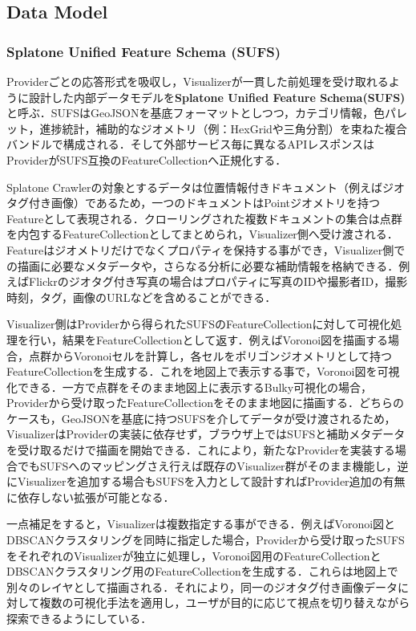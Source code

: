 \subsection{Data Model}

\subsubsection{Splatone Unified Feature Schema (SUFS)}
Providerごとの応答形式を吸収し，Visualizerが一貫した前処理を受け取れるように設計した内部データモデルを\textbf{Splatone Unified Feature Schema(SUFS)}と呼ぶ．SUFSはGeoJSONを基底フォーマットとしつつ，カテゴリ情報，色パレット，進捗統計，補助的なジオメトリ（例：HexGridや三角分割）を束ねた複合バンドルで構成される．そして外部サービス毎に異なるAPIレスポンスはProviderがSUFS互換のFeatureCollectionへ正規化する．

Splatone Crawlerの対象とするデータは位置情報付きドキュメント（例えばジオタグ付き画像）であるため，一つのドキュメントはPointジオメトリを持つFeatureとして表現される．クローリングされた複数ドキュメントの集合は点群を内包するFeatureCollectionとしてまとめられ，Visualizer側へ受け渡される．Featureはジオメトリだけでなくプロパティを保持する事ができ，Visualizer側での描画に必要なメタデータや，さらなる分析に必要な補助情報を格納できる．例えばFlickrのジオタグ付き写真の場合はプロパティに写真のIDや撮影者ID，撮影時刻，タグ，画像のURLなどを含めることができる．

Visualizer側はProviderから得られたSUFSのFeatureCollectionに対して可視化処理を行い，結果をFeatureCollectionとして返す．例えばVoronoi図を描画する場合，点群からVoronoiセルを計算し，各セルをポリゴンジオメトリとして持つFeatureCollectionを生成する．これを地図上で表示する事で，Voronoi図を可視化できる．一方で点群をそのまま地図上に表示するBulky可視化の場合，Providerから受け取ったFeatureCollectionをそのまま地図に描画する．どちらのケースも，GeoJSONを基底に持つSUFSを介してデータが受け渡されるため，VisualizerはProviderの実装に依存せず，ブラウザ上ではSUFSと補助メタデータを受け取るだけで描画を開始できる．これにより，新たなProviderを実装する場合でもSUFSへのマッピングさえ行えば既存のVisualizer群がそのまま機能し，逆にVisualizerを追加する場合もSUFSを入力として設計すればProvider追加の有無に依存しない拡張が可能となる．

一点補足をすると，Visualizerは複数指定する事ができる．例えばVoronoi図とDBSCANクラスタリングを同時に指定した場合，Providerから受け取ったSUFSをそれぞれのVisualizerが独立に処理し，Voronoi図用のFeatureCollectionとDBSCANクラスタリング用のFeatureCollectionを生成する．これらは地図上で別々のレイヤとして描画される．それにより，同一のジオタグ付き画像データに対して複数の可視化手法を適用し，ユーザが目的に応じて視点を切り替えながら探索できるようにしている．


